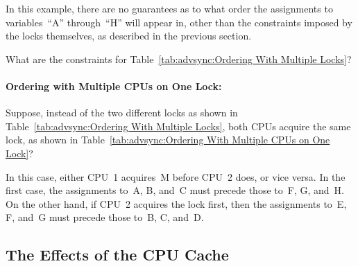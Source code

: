 In this example, there are no guarantees as to what order the
assignments to variables~``A'' through~``H'' will appear in, other
than the constraints imposed by the locks themselves, as
described in the previous section.

\QuickQuiz{}
	What are the constraints for
	Table~\ref{tab:advsync:Ordering With Multiple Locks}?
 \QuickQuizEnd

\paragraph{Ordering with Multiple CPUs on One Lock:}
Suppose, instead of the two different locks as shown in
Table~\ref{tab:advsync:Ordering With Multiple Locks}, both CPUs acquire
the same lock, as shown in
Table~\ref{tab:advsync:Ordering With Multiple CPUs on One Lock}?

\begin{table}[htbp]
\scriptsize{}
\caption{Ordering With Multiple CPUs on One Lock}
\label{tab:advsync:Ordering With Multiple CPUs on One Lock}
\end{table}

In this case, either CPU~1 acquires~M before CPU~2 does, or vice versa.
In the first case, the assignments to~A, B, and~C must precede
those to~F, G, and~H.
On the other hand, if CPU~2 acquires the lock first, then the
assignments to~E, F, and~G must precede those to~B, C, and~D.

\subsection{The Effects of the CPU Cache}
\label{sec:advsync:The Effects of the CPU Cache}

